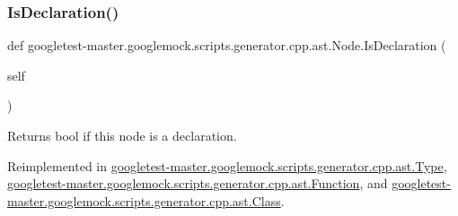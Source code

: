 \mbox{\label{classgoogletest-master_1_1googlemock_1_1scripts_1_1generator_1_1cpp_1_1ast_1_1_node_ac675d48443725155c9e5a16a4079a163}} 
\subsubsection{\texorpdfstring{IsDeclaration()}{IsDeclaration()}}
{\footnotesize\ttfamily def googletest-\/master.\+googlemock.\+scripts.\+generator.\+cpp.\+ast.\+Node.\+Is\+Declaration (\begin{DoxyParamCaption}\item[{}]{self }\end{DoxyParamCaption})}

\begin{DoxyVerb}Returns bool if this node is a declaration.\end{DoxyVerb}
 

Reimplemented in \mbox{\hyperlink{classgoogletest-master_1_1googlemock_1_1scripts_1_1generator_1_1cpp_1_1ast_1_1_type_a5ca0b9204c6fc40defcdd499164f039b}{googletest-\/master.\+googlemock.\+scripts.\+generator.\+cpp.\+ast.\+Type}}, \mbox{\hyperlink{classgoogletest-master_1_1googlemock_1_1scripts_1_1generator_1_1cpp_1_1ast_1_1_function_af230b7c3d5f9216718488d22642f8d9d}{googletest-\/master.\+googlemock.\+scripts.\+generator.\+cpp.\+ast.\+Function}}, and \mbox{\hyperlink{classgoogletest-master_1_1googlemock_1_1scripts_1_1generator_1_1cpp_1_1ast_1_1_class_a756fb1d87be3d6009451550c7fd6442a}{googletest-\/master.\+googlemock.\+scripts.\+generator.\+cpp.\+ast.\+Class}}.

\mbox{\label{classgoogletest-master_1_1googlemock_1_1scripts_1_1generator_1_1cpp_1_1ast_1_1_node_a3a3edec9cd30222cfea1295005abadd3}} 
